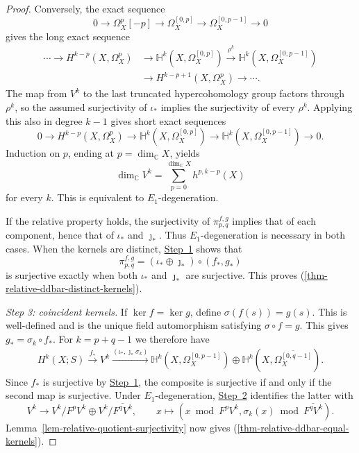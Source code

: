 \documentclass[11pt]{amsart}
\numberwithin{equation}{section}
\theoremstyle{plain}
\theoremstyle{definition}
\begin{document}
\begin{proof}
Conversely, the exact sequence
\[
0\longrightarrow\Omega_X^p[-p]
\longrightarrow\Omega_X^{[0,p]}
\longrightarrow\Omega_X^{[0,p-1]}\longrightarrow0
\]
gives the long exact sequence
\[
\begin{aligned}
\cdots\longrightarrow H^{k-p}(X,\Omega_X^p)
&\longrightarrow\mathbb H^k(X,\Omega_X^{[0,p]})
\xrightarrow{\rho^k}\mathbb H^k(X,\Omega_X^{[0,p-1]})\\
&\longrightarrow H^{k-p+1}(X,\Omega_X^p)\longrightarrow\cdots.
\end{aligned}
\]
The map from $V^k$ to the last truncated hypercohomology group factors
through $\rho^k$, so the assumed surjectivity of $\iota_*$ implies the
surjectivity of every $\rho^k$. Applying this also in degree $k-1$
gives short exact sequences
\[
0\longrightarrow H^{k-p}(X,\Omega_X^p)
\longrightarrow\mathbb H^k(X,\Omega_X^{[0,p]})
\longrightarrow\mathbb H^k(X,\Omega_X^{[0,p-1]})
\longrightarrow0.
\]
Induction on $p$, ending at $p=\dim_{\mathbb C}X$, yields
\[
\dim_{\mathbb C}V^k
=\sum_{p=0}^{\dim_{\mathbb C}X}h^{p,k-p}(X)
\]
for every $k$. This is equivalent to $E_1$-degeneration.

If the relative property holds, the surjectivity of $\pi_{p,q}^{f,g}$
implies that of each component, hence that of $\iota_*$ and $\jmath_*$.
Thus $E_1$-degeneration is necessary in both cases.
When the kernels are distinct,
\hyperref[step-relative-ddbar-1]{Step~1} shows that
\[
\pi_{p,q}^{f,g}=(\iota_*\oplus \jmath_*)\circ(f_*,g_*)
\]
is surjective exactly when both $\iota_*$ and $\jmath_*$ are surjective.
This proves (\ref{thm-relative-ddbar-distinct-kernels}).

\smallskip
{}\label{step-relative-ddbar-3}
\emph{Step 3: coincident kernels.}
If $\ker f=\ker g$, define $\sigma(f(s))=g(s)$. This is well-defined
and is the unique field automorphism satisfying $\sigma\circ f=g$.
This gives
$g_*=\sigma_k\circ f_*$. For $k=p+q-1$ we therefore have
\[
\begin{aligned}
H^k(X;S)\xrightarrow{f_*}V^k
\xrightarrow{(\iota_*,\jmath_*\sigma_k)}
\mathbb H^k(X,\Omega_X^{[0,p-1]})
\oplus\mathbb H^k(X,\overline{\Omega_X^{[0,q-1]}}).
\end{aligned}
\]
Since $f_*$ is surjective by
\hyperref[step-relative-ddbar-1]{Step~1}, the composite is surjective if
and only if the second map is surjective. Under $E_1$-degeneration,
\hyperref[step-relative-ddbar-2]{Step~2} identifies the latter with
\[
V^k\longrightarrow V^k/F^pV^k\oplus V^k/\overline{F^qV^k},
\qquad x\longmapsto
(x\bmod F^pV^k,\sigma_k(x)\bmod\overline{F^qV^k}).
\]
Lemma~\ref{lem-relative-quotient-surjectivity} now gives
(\ref{thm-relative-ddbar-equal-kernels}).
\end{proof}
\end{document}
